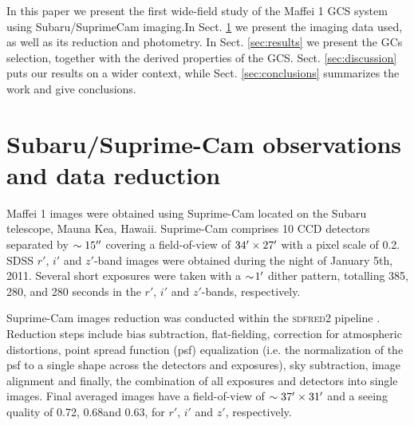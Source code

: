 \documentclass[useAMS,usenatbib]{mn2e}
\begin{document}
In this paper we present the first wide-field study of the Maffei 1
GCS system using Subaru/SuprimeCam imaging.In Sect. \ref{sec:obs} we
present the imaging data used, as well as its reduction and
photometry. In Sect. \ref{sec:results} we present the GCs selection,
together with the derived properties of the
GCS. Sect. \ref{sec:discussion} puts our results on a wider context,
while Sect. \ref{sec:conclusions} summarizes the work and give
conclusions.

\section{Subaru/Suprime-Cam observations and data reduction}
\label{sec:obs}



Maffei 1 images were obtained using Suprime-Cam \citep{miyazaki02}
located on the Subaru telescope, Mauna Kea, Hawaii. Suprime-Cam
comprises 10 CCD detectors separated by $\sim15\hbox{$^{\prime\prime}$}$ covering a
field-of-view of $34\hbox{$^\prime$}\times27\hbox{$^\prime$}$ with a pixel scale of
0.2\arcsec. SDSS $r'$, $i'$ and $z'$-band images were obtained during
the night of January 5th, 2011.  Several short exposures were taken
with a $\sim\!  1\hbox{$^\prime$}$ dither pattern, totalling 385, 280, and 280
seconds in the $r'$, $i'$ and $z'$-bands, respectively.

Suprime-Cam images reduction was conducted within the \textsc{sdfred2}
pipeline \citep{ouchi04}. Reduction steps include bias subtraction,
flat-fielding, correction for atmospheric distortions, point spread
function (psf) equalization (i.e. the normalization of the psf to a
single shape across the detectors and exposures), sky subtraction,
image alignment and finally, the combination of all exposures and
detectors into single images. Final averaged images have a
field-of-view of $\sim37\hbox{$^\prime$}\times 31\hbox{$^\prime$}$ and a seeing quality
of 0.72\arcsec, 0.68\arcsec and 0.63\arcsec, for $r'$, $i'$ and $z'$,
respectively.
\end{document}
